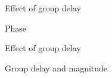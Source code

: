 \documentclass[10pt, handout]{beamer}
\begin{document}
%
\begin{frame}{Effect of group delay}
	\begin{block}{Phase}
		\begin{center}
		\end{center}		
	\end{block}
\end{frame}

\begin{frame}{Effect of group delay}
	\begin{block}{Group delay and magnitude}
		\begin{center}
		\end{center}		
	\end{block}
\end{frame}
\end{document}
